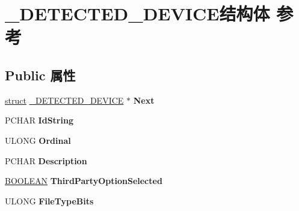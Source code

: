 \hypertarget{struct___d_e_t_e_c_t_e_d___d_e_v_i_c_e}{}\section{\+\_\+\+D\+E\+T\+E\+C\+T\+E\+D\+\_\+\+D\+E\+V\+I\+C\+E结构体 参考}
\label{struct___d_e_t_e_c_t_e_d___d_e_v_i_c_e}
\subsection*{Public 属性}
\begin{DoxyCompactItemize}
\item 
\mbox{\label{struct___d_e_t_e_c_t_e_d___d_e_v_i_c_e_a293ffacb1c323a1c568d43daee5ac2bb}} 
\hyperlink{interfacestruct}{struct} \hyperlink{struct___d_e_t_e_c_t_e_d___d_e_v_i_c_e}{\+\_\+\+D\+E\+T\+E\+C\+T\+E\+D\+\_\+\+D\+E\+V\+I\+CE} $\ast$ {\bfseries Next}
\item 
\mbox{\label{struct___d_e_t_e_c_t_e_d___d_e_v_i_c_e_a0b2b852991cb4c4fb7db93316888969e}} 
P\+C\+H\+AR {\bfseries Id\+String}
\item 
\mbox{\label{struct___d_e_t_e_c_t_e_d___d_e_v_i_c_e_a20484770423944e429dadffce4f59f3c}} 
U\+L\+O\+NG {\bfseries Ordinal}
\item 
\mbox{\label{struct___d_e_t_e_c_t_e_d___d_e_v_i_c_e_a6399a15899633420263ddf097bf6113e}} 
P\+C\+H\+AR {\bfseries Description}
\item 
\mbox{\label{struct___d_e_t_e_c_t_e_d___d_e_v_i_c_e_a4f5abf28748af8dc42d03c70a6920352}} 
\hyperlink{_processor_bind_8h_a112e3146cb38b6ee95e64d85842e380a}{B\+O\+O\+L\+E\+AN} {\bfseries Third\+Party\+Option\+Selected}
\item 
\mbox{\label{struct___d_e_t_e_c_t_e_d___d_e_v_i_c_e_aee495433195951e472aa06f79312a7f0}} 
U\+L\+O\+NG {\bfseries File\+Type\+Bits}
\item 
\mbox{\label{struct___d_e_t_e_c_t_e_d___d_e_v_i_c_e_ab292c868153b9a62ed29689533f20e37}} 

\end{DoxyCompactItemize}
